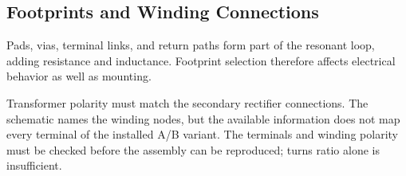 \subsection{Footprints and Winding Connections}
\label{sec:mag-footprint}

Pads, vias, terminal links, and return paths form part of the resonant loop, adding resistance and inductance. Footprint selection therefore affects electrical behavior as well as mounting.

Transformer polarity must match the secondary rectifier connections. The schematic names the winding nodes, but the available information does not map every terminal of the installed A/B variant. The terminals and winding polarity must be checked before the assembly can be reproduced; turns ratio alone is insufficient.
